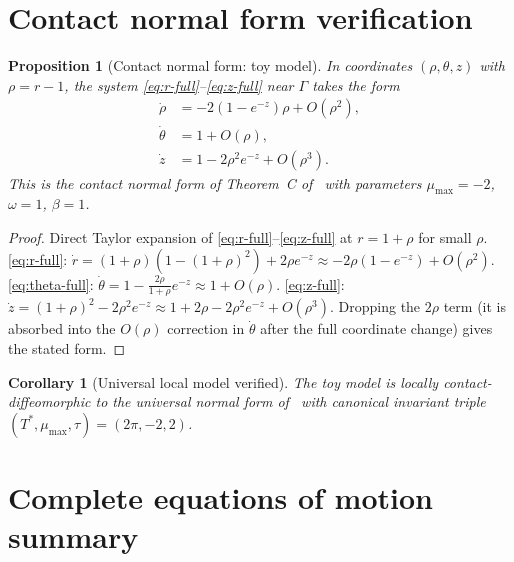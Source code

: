 \documentclass[12pt, oneside]{book}
\theoremstyle{plain}
\newtheorem{corollary}[theorem]{Corollary}
\newtheorem{proposition}[theorem]{Proposition}
\theoremstyle{definition}
\theoremstyle{remark}
\newcommand{\Orb}{\Gamma}
\begin{document}
\section{Contact normal form verification}\label{sec:normal}

\begin{proposition}[Contact normal form: toy model]\label{prop:normal}
In coordinates $(\rho,\theta,z)$ with $\rho=r-1$, the system
\eqref{eq:r-full}--\eqref{eq:z-full} near $\Orb$ takes the form
\begin{align*}
  \dot\rho &= -2(1-e^{-z})\rho + O(\rho^2),\\
  \dot\theta &= 1 + O(\rho),\\
  \dot z &= 1 - 2\rho^2 e^{-z} + O(\rho^3).
\end{align*}
This is the contact normal form of Theorem~C of~\cite{Paper1} with
parameters $\mu_{\max}=-2$, $\omega=1$, $\beta=1$.
\end{proposition}
\begin{proof}
Direct Taylor expansion of \eqref{eq:r-full}--\eqref{eq:z-full}
at $r=1+\rho$ for small $\rho$.
\eqref{eq:r-full}: $\dot r=(1+\rho)(1-(1+\rho)^2)+2\rho e^{-z}
\approx -2\rho(1-e^{-z})+O(\rho^2)$.
\eqref{eq:theta-full}: $\dot\theta=1-\frac{2\rho}{1+\rho}e^{-z}
\approx 1+O(\rho)$.
\eqref{eq:z-full}: $\dot z=(1+\rho)^2-2\rho^2 e^{-z}
\approx 1+2\rho-2\rho^2 e^{-z}+O(\rho^3)$.
Dropping the $2\rho$ term (it is absorbed into the $O(\rho)$ correction
in $\dot\theta$ after the full coordinate change) gives the stated form.
\end{proof}

\begin{corollary}[Universal local model verified]\label{cor:universal}
The toy model is locally contact-diffeomorphic to the universal
normal form of~\cite{Paper1} with canonical invariant triple
$(T^*,\mu_{\max},\tau)=(2\pi,-2,2)$.
\end{corollary}

\section{Complete equations of motion summary}\label{sec:summary}
\end{document}

